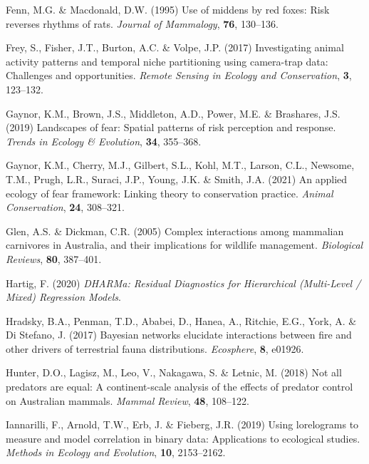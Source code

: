 \documentclass[]{elsarticle} %
\begin{document}
\leavevmode\hypertarget{ref-fenn1995use}{}%
Fenn, M.G. \& Macdonald, D.W. (1995) Use of middens by red foxes: Risk reverses rhythms of rats. \emph{Journal of Mammalogy}, \textbf{76}, 130--136.

\leavevmode\hypertarget{ref-frey2017investigating}{}%
Frey, S., Fisher, J.T., Burton, A.C. \& Volpe, J.P. (2017) Investigating animal activity patterns and temporal niche partitioning using camera-trap data: Challenges and opportunities. \emph{Remote Sensing in Ecology and Conservation}, \textbf{3}, 123--132.

\leavevmode\hypertarget{ref-gaynor2019landscapes}{}%
Gaynor, K.M., Brown, J.S., Middleton, A.D., Power, M.E. \& Brashares, J.S. (2019) Landscapes of fear: Spatial patterns of risk perception and response. \emph{Trends in Ecology \& Evolution}, \textbf{34}, 355--368.

\leavevmode\hypertarget{ref-gaynor2021applied}{}%
Gaynor, K.M., Cherry, M.J., Gilbert, S.L., Kohl, M.T., Larson, C.L., Newsome, T.M., Prugh, L.R., Suraci, J.P., Young, J.K. \& Smith, J.A. (2021) An applied ecology of fear framework: Linking theory to conservation practice. \emph{Animal Conservation}, \textbf{24}, 308--321.

\leavevmode\hypertarget{ref-glen2005complex}{}%
Glen, A.S. \& Dickman, C.R. (2005) Complex interactions among mammalian carnivores in Australia, and their implications for wildlife management. \emph{Biological Reviews}, \textbf{80}, 387--401.

\leavevmode\hypertarget{ref-DHARMa}{}%
Hartig, F. (2020) \emph{DHARMa: Residual Diagnostics for Hierarchical (Multi-Level / Mixed) Regression Models}.

\leavevmode\hypertarget{ref-hradsky2017bayesian}{}%
Hradsky, B.A., Penman, T.D., Ababei, D., Hanea, A., Ritchie, E.G., York, A. \& Di Stefano, J. (2017) Bayesian networks elucidate interactions between fire and other drivers of terrestrial fauna distributions. \emph{Ecosphere}, \textbf{8}, e01926.

\leavevmode\hypertarget{ref-hunter2018not}{}%
Hunter, D.O., Lagisz, M., Leo, V., Nakagawa, S. \& Letnic, M. (2018) Not all predators are equal: A continent-scale analysis of the effects of predator control on Australian mammals. \emph{Mammal Review}, \textbf{48}, 108--122.

\leavevmode\hypertarget{ref-iannarilli2019lorelograms}{}%
Iannarilli, F., Arnold, T.W., Erb, J. \& Fieberg, J.R. (2019) Using lorelograms to measure and model correlation in binary data: Applications to ecological studies. \emph{Methods in Ecology and Evolution}, \textbf{10}, 2153--2162.
\end{document}
